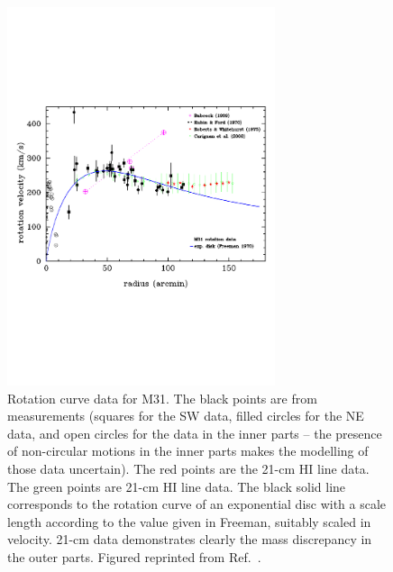 \begin{figure}[h!]
	\centering
	\includegraphics[width = 0.7\textwidth]{figures/DMOverview/m31-babcock-rf-rw.pdf}
	\caption[Galactic rotation curve data for M31.]{Rotation curve data for M31. The black points are from measurements (squares for the SW data, filled circles for the NE data, and open circles for the data in the inner parts – the presence of non-circular motions in the inner parts makes the modelling of those data uncertain). The red points are the 21-cm HI line data. The green points are 21-cm HI line data. The black solid line corresponds to the rotation curve of an exponential disc with a scale length according to the value given in Freeman, suitably scaled in velocity. 21-cm data demonstrates clearly the mass discrepancy in the outer parts. Figured reprinted from Ref.~\cite{HistoryofDM}.}
	\label{fig:DMOverview/NGC6503}
\end{figure}
